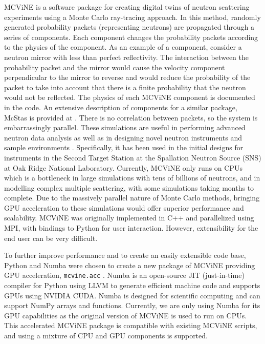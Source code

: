 MCViNE \cite{lin2016mcvine,Lin_2019} is a software package for creating digital twins of neutron scattering experiments using a Monte Carlo ray-tracing approach.
In this method, randomly generated probability packets (representing neutrons) are propagated through a series of components.
Each component changes the probability packets according to the physics of the component.
As an example of a component, consider a neutron mirror with less than perfect reflectivity. The interaction between the probability packet and the mirror would cause the velocity component perpendicular to the mirror to reverse and would reduce the probability of the packet to take into account that there is a finite probability that the neutron would not be reflected. The physics of each MCViNE component is documented in the code.
An extensive description of components for a similar package, McStas is provided at \cite{willendrup_components}.
There is no correlation between packets, so the system is embarrassingly parallel.
These simulations are useful in performing advanced neutron data analysis \cite{lin2022super,islam2019super,sala2022ferrimagnetic,do2022damped,leiner2019frustrated,lin2014UN} as well as in designing novel neutron instruments \cite{mamontov2022bwaves,an2022menus,sala2022chess,garlea2022verdi,leighton2022ewald,liu2022pioneer,qian2022centaur,changwoo2022expanse,ankner2023cinematic,hassina2023cupi2d,linjiao2023guide_misalignment} and sample environments \cite{stone2019design,niedziela2017design}. Specifically, it has been used in the initial designs for instruments in the Second Target Station at the Spallation Neutron Source (SNS) \cite{mason2006spallation} at Oak Ridge National Laboratory.
Currently, MCViNE only runs on CPUs which is a bottleneck in large simulations with tens of billions of neutrons, and in modelling complex multiple scattering, with some simulations taking months to complete. Due to the massively parallel nature of Monte Carlo methods, bringing GPU acceleration to these simulations would offer superior performance and scalability. MCViNE was originally implemented in C++ and parallelized using MPI, with bindings to Python for user interaction.
However, extensibility for the end user can be very difficult.

To further improve performance and to create an easily extensible code base, Python and Numba \cite{lam2015numba} were chosen to create a new package of MCViNE providing GPU acceleration, \texttt{mcvine.acc} \cite{Lin_mcvine_acc}. Numba is an open-source JIT (just-in-time) compiler for Python using LLVM to generate efficient machine code and supports GPUs using NVIDIA CUDA. Numba is designed for scientific computing and can support NumPy arrays and functions. Currently, we are only using Numba for its GPU capabilities as the original version of MCViNE is used to run on CPUs. This accelerated MCViNE package is compatible with existing MCViNE scripts, and using a mixture of CPU and GPU components is supported.

